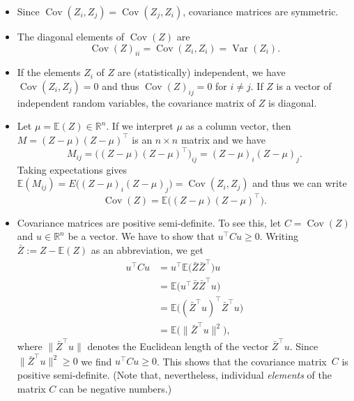 \documentclass[
  a4paper,
]{article}
\theoremstyle{definition}
\theoremstyle{definition}
\theoremstyle{definition}
\theoremstyle{definition}
\theoremstyle{remark}
\begin{document}
\begin{itemize}
\item
  Since \(\mathop{\mathrm{Cov}}(Z_i, Z_j) = \mathop{\mathrm{Cov}}(Z_j, Z_i)\), covariance matrices are
  symmetric.
\item
  The diagonal elements of \(\mathop{\mathrm{Cov}}(Z)\) are
  \begin{equation}
    \mathop{\mathrm{Cov}}(Z)_{ii}
    = \mathop{\mathrm{Cov}}(Z_i, Z_i)
    = \mathop{\mathrm{Var}}(Z_i).  \label{eq:Cov-diag-elem}
  \end{equation}
\item
  If the elements \(Z_i\) of \(Z\) are (statistically) independent,
  we have \(\mathop{\mathrm{Cov}}(Z_i, Z_j) = 0\) and thus \(\mathop{\mathrm{Cov}}(Z)_{ij} = 0\)
  for \(i \neq j\). If \(Z\) is a vector of independent random variables,
  the covariance matrix of \(Z\) is diagonal.
\item
  Let \(\mu = \mathbb{E}(Z) \in \mathbb{R}^n\). If we interpret \(\mu\) as a column vector,
  then \(M = (Z - \mu) (Z - \mu)^\top\) is an \(n\times n\) matrix and we have
  \begin{equation*}
    M_{ij}
    = \bigl( (Z - \mu) (Z - \mu)^\top \bigr)_{ij}
    = (Z - \mu)_i (Z - \mu)_j.
  \end{equation*}
  Taking expectations gives \(\mathbb{E}(M_{ij}) = E\bigl( (Z - \mu)_i (Z - \mu)_j \bigr) = \mathop{\mathrm{Cov}}(Z_i, Z_j)\) and thus we can write
  \begin{equation}
    \mathop{\mathrm{Cov}}(Z)
    = \mathbb{E}\bigl( (Z - \mu) (Z - \mu)^\top \bigr).  \label{eq:cov-prod}
  \end{equation}
\item
  Covariance matrices are positive semi-definite. To see this, let
  \(C = \mathop{\mathrm{Cov}}(Z)\) and \(u \in\mathbb{R}^n\) be a vector. We have to show that
  \(u^\top C u \geq 0\). Writing \(\bar Z := Z - \mathbb{E}(Z)\) as an abbreviation,
  we get
  \begin{align*}
    u^\top C u
    &= u^\top \mathbb{E}\bigl( \bar Z \bar Z^\top \bigr) u \\
    &= \mathbb{E}\bigl( u^\top \bar Z \bar Z^\top u \bigr) \\
    &= \mathbb{E}\bigl( (\bar Z^\top u)^\top \bar Z^\top u \bigr) \\
    &= \mathbb{E}\bigl( \|\bar Z^\top u\|^2 \bigr),
  \end{align*}
  where \(\|\bar Z^\top u\|\) denotes the Euclidean length of the
  vector \(\bar Z^\top u\). Since \(\|\bar Z^\top u\|^2 \geq 0\)
  we find \(u^\top C u \geq 0\). This shows that the covariance matrix~\(C\)
  is positive semi-definite. (Note that, nevertheless,
  individual \emph{elements} of the matrix \(C\) can be negative numbers.)
\end{itemize}
\end{document}
